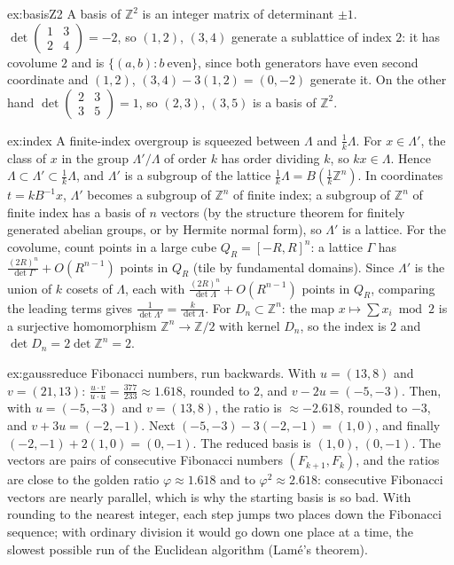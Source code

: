 \begin{solution}{ex:basisZ2}
\idea A basis of $\mathbb Z^2$ is an integer matrix of determinant $\pm1$.
\writeup $\det\begin{pmatrix}1&3\\2&4\end{pmatrix}=-2$, so $(1,2)$, $(3,4)$ generate a sublattice of index $2$: it has covolume $2$ and is
$\{(a,b):b\ \text{even}\}$, since both generators have even second coordinate and $(1,2)$, $(3,4)-3(1,2)=(0,-2)$ generate it. On the other hand
$\det\begin{pmatrix}2&3\\3&5\end{pmatrix}=1$, so $(2,3)$, $(3,5)$ is a basis of $\mathbb Z^2$.
\end{solution}

\begin{solution}{ex:index}
\idea A finite-index overgroup is squeezed between $\Lambda$ and $\frac1k\Lambda$.
\writeup For $x\in\Lambda'$, the class of $x$ in the group $\Lambda'/\Lambda$ of order $k$ has order dividing $k$, so $kx\in\Lambda$. Hence
$\Lambda\subset\Lambda'\subset\frac1k\Lambda$, and $\Lambda'$ is a subgroup of the lattice $\frac1k\Lambda=B(\frac1k\mathbb Z^n)$. In coordinates
$t=kB^{-1}x$, $\Lambda'$ becomes a subgroup of $\mathbb Z^n$ of finite index; a subgroup of $\mathbb Z^n$ of finite index has a basis of $n$ vectors (by the
structure theorem for finitely generated abelian groups, or by Hermite normal form), so $\Lambda'$ is a lattice. For the covolume, count points in a large
cube $Q_R=[-R,R]^n$: a lattice $\Gamma$ has $\frac{(2R)^n}{\det\Gamma}+O(R^{n-1})$ points in $Q_R$ (tile by fundamental domains). Since $\Lambda'$ is the union of
$k$ cosets of $\Lambda$, each with $\frac{(2R)^n}{\det\Lambda}+O(R^{n-1})$ points in $Q_R$, comparing the leading terms gives $\frac1{\det\Lambda'}=\frac
k{\det\Lambda}$. For $D_n\subset\mathbb Z^n$: the map $x\mapsto\sum x_i\bmod2$ is a surjective homomorphism $\mathbb Z^n\to\mathbb Z/2$ with kernel $D_n$, so the
index is $2$ and $\det D_n=2\det\mathbb Z^n=2$.
\end{solution}

\begin{solution}{ex:gaussreduce}
\idea Fibonacci numbers, run backwards.
\writeup With $u=(13,8)$ and $v=(21,13)$: $\frac{u\cdot v}{u\cdot u}=\frac{377}{233}\approx1.618$, rounded to $2$, and $v-2u=(-5,-3)$. Then, with
$u=(-5,-3)$ and $v=(13,8)$, the ratio is $\approx-2.618$, rounded to $-3$, and $v+3u=(-2,-1)$. Next $(-5,-3)-3(-2,-1)=(1,0)$, and finally
$(-2,-1)+2(1,0)=(0,-1)$. The reduced basis is $(1,0)$, $(0,-1)$. The vectors are pairs of consecutive Fibonacci numbers $(F_{k+1},F_k)$, and the ratios are close
to the golden ratio $\varphi\approx1.618$ and to $\varphi^2\approx2.618$: consecutive Fibonacci vectors are nearly parallel, which is why the starting basis is
so bad. With rounding to the nearest integer, each step jumps two places down the Fibonacci sequence; with ordinary division it would go down one place
at a time, the slowest possible run of the Euclidean algorithm (Lam\'e's theorem).
\end{solution}

